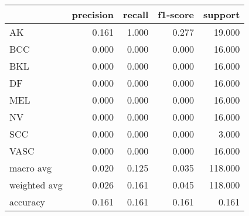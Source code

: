\begin{tabular}{lrrrr}
\toprule
 & precision & recall & f1-score & support \\
\midrule
AK & 0.161 & 1.000 & 0.277 & 19.000 \\
BCC & 0.000 & 0.000 & 0.000 & 16.000 \\
BKL & 0.000 & 0.000 & 0.000 & 16.000 \\
DF & 0.000 & 0.000 & 0.000 & 16.000 \\
MEL & 0.000 & 0.000 & 0.000 & 16.000 \\
NV & 0.000 & 0.000 & 0.000 & 16.000 \\
SCC & 0.000 & 0.000 & 0.000 & 3.000 \\
VASC & 0.000 & 0.000 & 0.000 & 16.000 \\
macro avg & 0.020 & 0.125 & 0.035 & 118.000 \\
weighted avg & 0.026 & 0.161 & 0.045 & 118.000 \\
accuracy & 0.161 & 0.161 & 0.161 & 0.161 \\
\bottomrule
\end{tabular}
